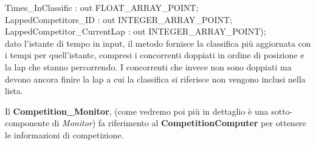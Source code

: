 \begin{itemize}
\begin{description}
{{Times\_InClassific : out FLOAT\_ARRAY\_POINT;\\ LappedCompetitors\_ID : out INTEGER\_ARRAY\_POINT;\\ LappedCompetitor\_CurrentLap : out INTEGER\_ARRAY\_POINT);}}\\
dato l'istante di tempo in input, il metodo fornisce la classifica pi\`{u} aggiornata con i tempi per quell'istante, compresi i concorrenti doppiati in ordine
di posizione e la lap che stanno percorrendo. I concorrenti che invece non sono doppiati ma devono ancora finire la lap a cui la classifica si
riferisce non vengono inclusi nella lista.
\end{description}
\end{itemize}
Il \textbf{Competition\_Monitor}, (come vedremo poi pi\`{u} in dettaglio \`{e} una sotto-componente di \emph{Monitor}) fa riferimento al \textbf{CompetitionComputer} per 
ottenere le informazioni di competizione.
\newpage
